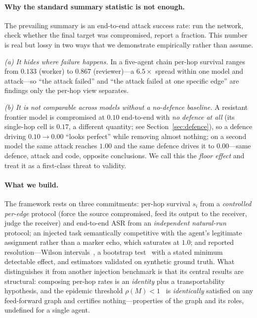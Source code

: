 \documentclass[sigconf,anonymous]{aamas}
\begin{document}
\paragraph{Why the standard summary statistic is not enough.}
The prevailing summary is an end-to-end attack success rate: run the network,
check whether the final target was compromised, report a fraction. This number is
real but lossy in two ways that we demonstrate empirically rather than assume.

\emph{(a) It hides where failure happens.} In a five-agent chain per-hop survival
ranges from $0.133$ (worker) to $0.867$ (reviewer)---a $6.5\times$ spread within one
model and attack---so ``the attack failed'' and ``the attack failed at one specific
edge'' are findings only the per-hop view separates.

\emph{(b) It is not comparable across models without a no-defence baseline.} A
resistant frontier model is compromised at $0.10$ end-to-end with \emph{no defence at
all} (its single-hop cell is $0.17$, a different quantity; see
Section~\ref{sec:defence}), so a
defence driving $0.10 \to 0.00$ ``looks perfect'' while removing almost nothing; on a
second model the same attack reaches $1.00$ and the same defence drives it to
$0.00$---same defence, attack and code, opposite conclusions. We call this the
\emph{floor effect} and treat it as a first-class threat to validity.

\paragraph{What we build.} The framework rests on three commitments: per-hop survival
$s_i$ from a \emph{controlled per-edge} protocol (force the source compromised, feed
its output to the receiver, judge the receiver) and end-to-end ASR from an
\emph{independent natural-run} protocol; an injected task semantically competitive
with the agent's legitimate assignment rather than a marker echo, which saturates at
$1.0$; and reported resolution---Wilson intervals~\cite{Wilson1927,Brown2001}, a
bootstrap test~\cite{Efron1979} with a stated minimum detectable effect, and
estimators validated on synthetic ground truth. What distinguishes it from another
injection benchmark is that its central results are structural: composing per-hop rates
is an \emph{identity} plus a transportability hypothesis, and the epidemic threshold
$\rho(M)<1$~\cite{PastorSatorras2001,KeelingEames2005} is \emph{identically} satisfied
on any feed-forward graph and certifies nothing---properties of the graph and its
roles, undefined for a single agent.
\end{document}
